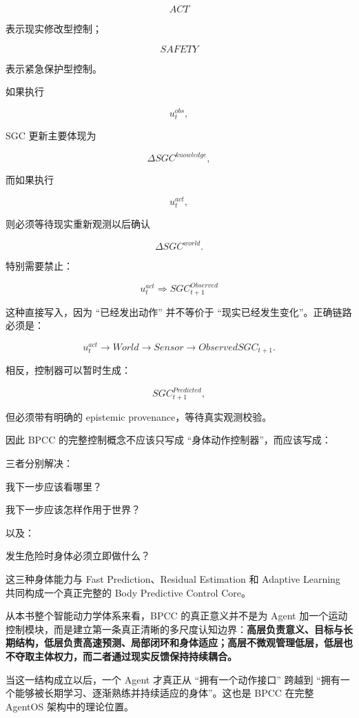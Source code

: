 \[
ACT
\]

表示现实修改型控制；

\[
SAFETY
\]

表示紧急保护型控制。

如果执行

\[
u_t^{obs},
\]

SGC 更新主要体现为

\[
\Delta SGC^{knowledge},
\]

而如果执行

\[
u_t^{act},
\]

则必须等待现实重新观测以后确认

\[
\Delta SGC^{world}.
\]

特别需要禁止：

\[
u_t^{act}
\Rightarrow
SGC_{t+1}^{Observed}
\]

这种直接写入，因为 ``已经发出动作'' 并不等价于 ``现实已经发生变化''。正确链路必须是：

\[
u_t^{act}
\rightarrow
World
\rightarrow
Sensor
\rightarrow
ObservedSGC_{t+1}.
\]

相反，控制器可以暂时生成：

\[
SGC_{t+1}^{Predicted},
\]

但必须带有明确的 epistemic provenance，等待真实观测校验。

因此 BPCC 的完整控制概念不应该只写成 ``身体动作控制器''，而应该写成：

\begin{statementbox}
\centering
{}
\end{statementbox}

三者分别解决：

\begin{statementbox}
我下一步应该看哪里？
\end{statementbox}

\begin{statementbox}
我下一步应该怎样作用于世界？
\end{statementbox}

以及：

\begin{statementbox}
发生危险时身体必须立即做什么？
\end{statementbox}

这三种身体能力与 Fast Prediction、Residual Estimation 和 Adaptive Learning 共同构成一个真正完整的 Body Predictive Control Core。


从本书整个智能动力学体系来看，BPCC 的真正意义并不是为 Agent 加一个运动控制模块，而是建立第一条真正清晰的多尺度认知边界：\textbf{高层负责意义、目标与长期结构，低层负责高速预测、局部闭环和身体适应；高层不微观管理低层，低层也不夺取主体权力，而二者通过现实反馈保持持续耦合。}

当这一结构成立以后，一个 Agent 才真正从 ``拥有一个动作接口'' 跨越到 ``拥有一个能够被长期学习、逐渐熟练并持续适应的身体''。这也是 BPCC 在完整 AgentOS 架构中的理论位置。
